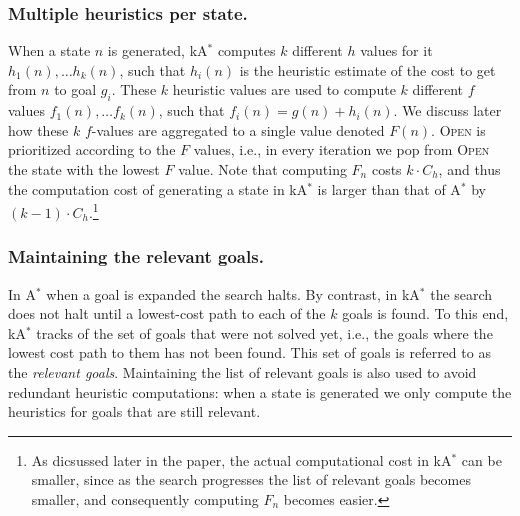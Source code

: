 \documentclass{aicom2e}
\newcommand{\astar}{A$^*$}
\newcommand{\kastar}{kA$^*$}
\newcommand{\open}{\textsc{Open}}
\begin{document}
\subsubsection*{Multiple heuristics per state.} When a state $n$ is generated, \kastar{} computes 
$k$ different $h$ values for it $h_1(n),\ldots h_k(n)$, such that $h_i(n)$ is the heuristic estimate of the cost to get from $n$ to goal $g_i$. These $k$ heuristic values are used to compute $k$ different $f$ values $f_1(n),\ldots f_k(n)$, such that $f_i(n)=g(n)+h_i(n)$. We discuss later how these $k$ $f$-values are aggregated to a single value denoted $F(n)$. \open{} is prioritized according to the $F$ values, i.e., in every iteration we pop from \open{} the state with the lowest $F$ value. Note that computing $F_n$ costs $k\cdot C_h$, and thus the computation cost of generating a state in \kastar{} is larger than that of \astar{} by $(k-1)\cdot C_{h}$.\footnote{As dicsussed later in the paper, the actual computational cost in \kastar{} can be smaller, since as the search progresses the list of relevant goals becomes smaller, and consequently computing $F_n$ becomes easier.}

\subsubsection*{Maintaining the relevant goals.} In \astar{} when a goal is expanded the search halts. By contrast, in \kastar{} the search does not halt until a lowest-cost path to each of the $k$ goals is found. To this end, \kastar{} tracks of the set of goals that were not solved yet, i.e., the goals where the lowest cost path to them has not been found. This set of goals is referred to as the {\em relevant goals}. Maintaining the list of relevant goals is also used to avoid redundant heuristic computations: when a state is generated we only compute the heuristics for goals that are still relevant. 



\end{document}
